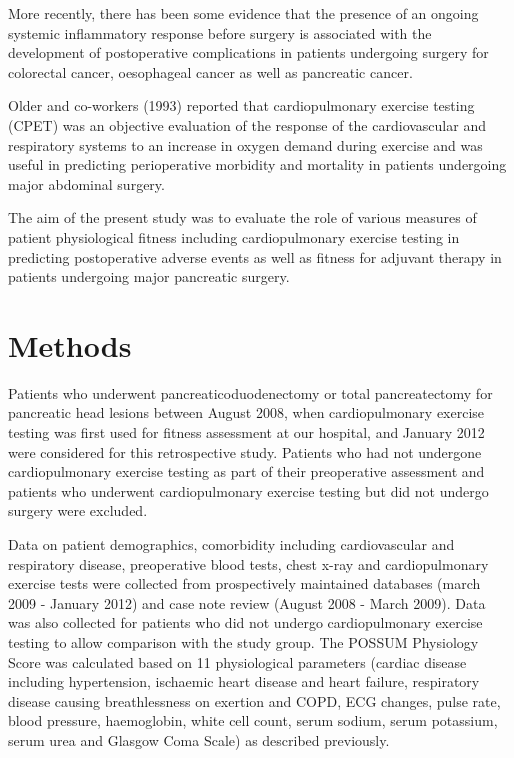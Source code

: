 More recently, there has been some evidence that the presence of an ongoing systemic inflammatory response before surgery is associated with the development of postoperative complications in patients undergoing surgery for colorectal cancer\parencite{moyes_preoperative_2009}, oesophageal cancer\parencite{vashist_glasgow_2010} as well as pancreatic cancer.\parencite{knight_evaluation_2010}

Older and co-workers (1993) reported that cardiopulmonary exercise testing (CPET) was an objective evaluation of the response of the cardiovascular and respiratory systems to an increase in oxygen demand during exercise and was useful in predicting perioperative morbidity and mortality in patients undergoing major abdominal surgery.\parencite{older_preoperative_1993}

The aim of the present study was to evaluate the role of various measures of patient physiological fitness including cardiopulmonary exercise testing in predicting postoperative adverse events as well as fitness for adjuvant therapy in patients undergoing major pancreatic surgery.

\clearpage

\section{Methods}
Patients who underwent pancreaticoduodenectomy or total pancreatectomy for pancreatic head lesions between August 2008, when cardiopulmonary exercise testing was first used for fitness assessment at our hospital, and January 2012 were considered for this retrospective study. Patients who had not undergone cardiopulmonary exercise testing as part of their preoperative assessment and patients who underwent cardiopulmonary exercise testing but did not undergo surgery were excluded. 

Data on patient demographics, comorbidity including cardiovascular and respiratory disease, preoperative blood tests, chest x-ray and cardiopulmonary exercise tests were collected from prospectively maintained databases (march 2009 - January 2012) and case note review (August 2008 - March 2009). Data was also collected for patients who did not undergo cardiopulmonary exercise testing to allow comparison with the study group. The POSSUM Physiology Score was calculated based on 11 physiological parameters (cardiac disease including hypertension, ischaemic heart disease and heart failure, respiratory disease causing breathlessness on exertion and COPD, ECG changes, pulse rate, blood pressure, haemoglobin, white cell count, serum sodium, serum potassium, serum urea and Glasgow Coma Scale) as described previously.

